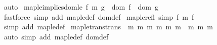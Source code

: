 \begin{isabellebody}
\isamarkupfalse%
\ auto%
\endisatagproof
{\isafoldproof}%
%
\isadelimproof
\isanewline
%
\endisadelimproof
\isanewline
{}\isamarkupfalse%
\ map{\isacharunderscore}{\kern0pt}le{\isacharunderscore}{\kern0pt}implies{\isacharunderscore}{\kern0pt}dom{\isacharunderscore}{\kern0pt}le{\isacharcolon}{\kern0pt}\ {\isachardoublequoteopen}{\isacharparenleft}{\kern0pt}f\ {\isasymsubseteq}\isactrlsub m\ g{\isacharparenright}{\kern0pt}\ {\isasymLongrightarrow}\ {\isacharparenleft}{\kern0pt}dom\ f\ {\isasymsubseteq}\ dom\ g{\isacharparenright}{\kern0pt}{\isachardoublequoteclose}\isanewline
%
\isadelimproof
\ \ %
\endisadelimproof
%
\isatagproof
{}\isamarkupfalse%
\ {\isacharparenleft}{\kern0pt}fastforce\ simp\ add{\isacharcolon}{\kern0pt}\ map{\isacharunderscore}{\kern0pt}le{\isacharunderscore}{\kern0pt}def\ dom{\isacharunderscore}{\kern0pt}def{\isacharparenright}{\kern0pt}%
\endisatagproof
{\isafoldproof}%
%
\isadelimproof
\isanewline
%
\endisadelimproof
\isanewline
{}\isamarkupfalse%
\ map{\isacharunderscore}{\kern0pt}le{\isacharunderscore}{\kern0pt}refl\ {\isacharbrackleft}{\kern0pt}simp{\isacharbrackright}{\kern0pt}{\isacharcolon}{\kern0pt}\ {\isachardoublequoteopen}f\ {\isasymsubseteq}\isactrlsub m\ f{\isachardoublequoteclose}\isanewline
%
\isadelimproof
\ \ %
\endisadelimproof
%
\isatagproof
{}\isamarkupfalse%
\ {\isacharparenleft}{\kern0pt}simp\ add{\isacharcolon}{\kern0pt}\ map{\isacharunderscore}{\kern0pt}le{\isacharunderscore}{\kern0pt}def{\isacharparenright}{\kern0pt}%
\endisatagproof
{\isafoldproof}%
%
\isadelimproof
\isanewline
%
\endisadelimproof
\isanewline
{}\isamarkupfalse%
\ map{\isacharunderscore}{\kern0pt}le{\isacharunderscore}{\kern0pt}trans{\isacharbrackleft}{\kern0pt}trans{\isacharbrackright}{\kern0pt}{\isacharcolon}{\kern0pt}\ {\isachardoublequoteopen}{\isasymlbrakk}\ m{}\ {\isasymsubseteq}\isactrlsub m\ m{}{\isacharsemicolon}{\kern0pt}\ m{}\ {\isasymsubseteq}\isactrlsub m\ m{}{\isasymrbrakk}\ {\isasymLongrightarrow}\ m{}\ {\isasymsubseteq}\isactrlsub m\ m{}{\isachardoublequoteclose}\isanewline
%
\isadelimproof
\ \ %
\endisadelimproof
%
\isatagproof
{}\isamarkupfalse%
\ {\isacharparenleft}{\kern0pt}auto\ simp\ add{\isacharcolon}{\kern0pt}\ map{\isacharunderscore}{\kern0pt}le{\isacharunderscore}{\kern0pt}def\ dom{\isacharunderscore}{\kern0pt}def{\isacharparenright}{\kern0pt}%
\endisatagproof
{\isafoldproof}%
%
\isadelimproof
\isanewline
%
\endisadelimproof
\isanewline
{}\isamarkupfalse%

\end{isabellebody}
